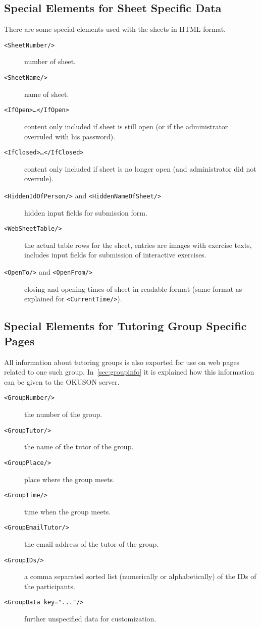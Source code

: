 \documentclass[12pt,openany,a4paper]{book}
\newcommand{\OKUSON}{\textsf{OKUSON}}
\begin{document}
\subsection{Special Elements for Sheet Specific Data}\label{ssec:sheetelements}

There are some special elements used with the sheets in HTML format.

\begin{description}
\item[\texttt{<SheetNumber/>}] number of sheet.
\item[\texttt{<SheetName/>}] name of sheet.
\item[\texttt{<IfOpen>\ldots</IfOpen>}] content only included if sheet is still open (or if the administrator overruled with his password).
\item[\texttt{<IfClosed>\ldots</IfClosed>}] content only included 
if sheet is no longer open (and administrator did not overrule).
\item[\texttt{<HiddenIdOfPerson/>} and \texttt{<HiddenNameOfSheet/>}] 
hidden input fields for submission form.
\item[\texttt{<WebSheetTable/>}] the actual table rows for the sheet, 
entries are images with exercise texts, includes input fields for submission of
interactive exercises.
\item[\texttt{<OpenTo/>} and \texttt{<OpenFrom/>}] closing and opening times
of sheet in readable format (same format as explained for  
\texttt{<CurrentTime/>}). 
\end{description}

\subsection{Special Elements for Tutoring Group Specific
Pages}\label{ssec:groupelements}

All information about tutoring groups is also exported for use on web pages
related to one such group. In~\ref{sec:groupinfo} it is explained how
this information can be given to the {\OKUSON} server.

\begin{description}
\item[\texttt{<GroupNumber/>}] the number of the group.
\item[\texttt{<GroupTutor/>}] the name  of the tutor of the group.
\item[\texttt{<GroupPlace/>}] place where the group meets.
\item[\texttt{<GroupTime/>}] time when  the group meets.
\item[\texttt{<GroupEmailTutor/>}] the email address of the tutor of the group.
\item[\texttt{<GroupIDs/>}] a comma separated sorted list (numerically or
alphabetically) of the IDs of the participants.
\item[\texttt{<GroupData key="..."/>}]  further unspecified 
data for customization.
\end{description}
\end{document}
